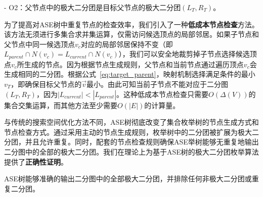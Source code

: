 - O2：父节点中的极大二分团是目标父节点的极大二分团$(L_T, R_T)$。


为了提高对ASE树中重复节点的检查效率，我们引入了一种\textbf{低成本节点检查}方法。该方法无须进行多集合求并集运算，仅需访问候选顶点的局部邻居。如果子节点和父节点中同一候选顶点$v_c$对应的局部邻居保持不变（即$L_{parent} \cap N(v_c) = L_{current} \cap N(v_c)$），我们可以安全地裁剪掉子节点选择候选顶点$v_c$所生成的节点。因为根据节点生成规则，父节点和当前节点通过遍历顶点$v_c$会生成相同的二分团。根据公式~\ref{eq:target_parent}，映射机制选择满足条件的最小$v_T$，即确保目标父节点的$\vec{v}$最小。由此可知当前子节点不能对应于二分图$(L_T, R_T)$，因为$|L_{current}|<|L_{parent}|$。这种低成本节点检查只需要$O(\Delta(V))$的集合交集运算，而其他方法至少需要$O(|E|)$的计算量。

与传统的搜索空间优化方法不同，ASE树彻底改变了集合枚举树的节点生成方式和节点检查方式。通过采用主动的节点生成规则，枚举树中的二分团被扩展为极大二分团，并且允许重复。同时，配套的节点检查规则确保ASE举树能够无重复地输出二分图中的全部的极大二分团。我们在理论上为基于ASE树的极大二分团枚举算法提供了\textbf{正确性证明}。


\begin{theorem}
  \label{theorem:correctness}
  ASE树能够准确的输出二分图中的全部极大二分团，并排除任何非极大二分团或重复二分团。
\end{theorem}


